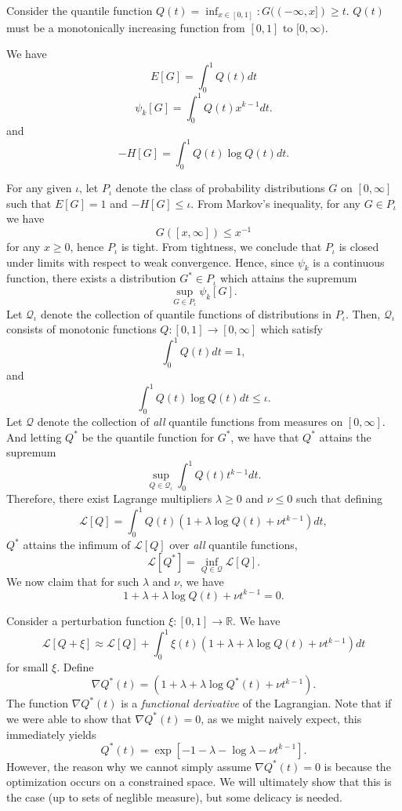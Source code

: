 \documentclass[12pt]{article}
\begin{document}
Consider the quantile function $Q(t) = \inf_{x \in [0,1]}: G((-\infty, x]) \geq t.$
$Q(t)$ must be a monotonically increasing function from $[0,1]$ to $[0,\infty).$

We have
\[
E[G] = \int_0^1 Q(t) dt
\]
\[
\psi_k[G] = \int_0^1 Q(t) x^{k-1} dt.
\]
and
\[
-H[G] = \int_0^1 Q(t) \log Q(t) dt.
\]

For any given $\iota$, let $P_\iota$ denote the class of probability
distributions $G$ on $[0, \infty]$ such that $E[G]=1$ and
$-H[G] \leq \iota.$  From Markov's inequality, for any $G \in P_\iota$
we have
\[
G([x, \infty]) \leq x^{-1}
\]
for any $x \geq 0$, hence $P_\iota$ is tight.  From tightness, we
conclude that $P_\iota$ is closed under limits with respect to weak
convergence.  Hence, since $\psi_k$ is a continuous function, there
exists a distribution $G^* \in P_\iota$ which attains the supremum
\[\sup_{G \in P_\iota} \psi_k[G].\]
Let $\mathcal{Q}_\iota$ denote the collection of quantile functions of
distributions in $P_\iota.$ Then, $\mathcal{Q}_\iota$ consists of monotonic functions
$Q: [0,1] \to [0, \infty]$ which
satisfy
\[
\int_0^1 Q(t) dt = 1,
\]
and
\[
\int_0^1 Q(t) \log Q(t) dt \leq \iota.
\]
Let $\mathcal{Q}$ denote the collection of \emph{all} quantile functions from measures on $[0,\infty]$.
And letting $Q^*$ be the quantile function for $G^*$, we have that
$Q^*$ attains the supremum
\[
\sup_{Q \in \mathcal{Q}_\iota} \int_0^1 Q(t) t^{k-1} dt.
\]
Therefore, there exist Lagrange multipliers
$\lambda \geq 0$ and $\nu \leq 0$ such that defining
\[
\mathcal{L}[Q] = \int_0^1 Q(t) (1 + \lambda \log Q(t) + \nu t^{k-1}) dt,
\]
$Q^*$ attains the infimum of $\mathcal{L}[Q]$ over \emph{all} quantile functions,
\[
\mathcal{L}[Q^*] = \inf_{Q \in \mathcal{Q}}\mathcal{L}[Q].
\]
We now claim that for such $\lambda$ and $\nu$, we have
\[
1 + \lambda + \lambda \log Q(t) + \nu t^{k-1} = 0.
\]

Consider a perturbation function $\xi: [0,1] \to \mathbb{R}$.
We have
\[
\mathcal{L}[Q + \xi] \approx \mathcal{L}[Q] + \int_0^1 \xi(t) (1 + \lambda + \lambda \log Q(t) + \nu t^{k-1}) dt
\]
for small $\xi$.
Define
\[
\nabla Q^*(t) = (1 + \lambda + \lambda \log Q^*(t) + \nu t^{k-1}).
\]
The function $\nabla Q^*(t)$ is a \emph{functional derivative} of the Lagrangian.
Note that if we were able to show that $\nabla Q^*(t) = 0$, as we might naively expect,
this immediately yields
\begin{equation}\label{eq:Qstareq}
Q^*(t) = \exp[-1 - \lambda -\log \lambda - \nu t^{k-1}].
\end{equation}
However, the reason why we cannot simply assume $\nabla Q^*(t) = 0$ is
because the optimization occurs on a constrained space.  We will
ultimately show that this is the case (up to sets of neglible
measure), but some delicacy is needed.
\end{document}
